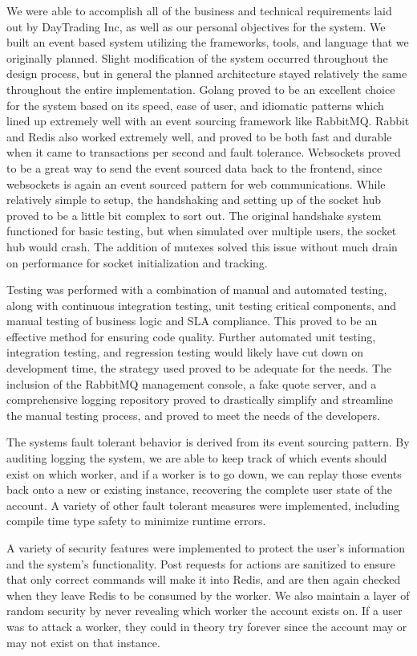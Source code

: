 \begin{Overview}
We were able to accomplish all of the business and technical requirements laid out by DayTrading Inc, as well as our personal objectives for the system.
We built an event based system utilizing the frameworks, tools, and language that we originally planned.
Slight modification of the system occurred throughout the design process, but in general the planned architecture stayed relatively the same throughout the entire implementation.
Golang proved to be an excellent choice for the system based on its speed, ease of user, and idiomatic patterns which lined up extremely well with an event sourcing framework like RabbitMQ.
Rabbit and Redis also worked extremely well, and proved to be both fast and durable when it came to transactions per second and fault tolerance.
Websockets proved to be a great way to send the event sourced data back to the frontend, since websockets is again an event sourced pattern for web communications.
While relatively simple to setup, the handshaking and setting up of the socket hub proved to be a little bit complex to sort out.
The original handshake system functioned for basic testing, but when simulated over multiple users, the socket hub would crash.
The addition of mutexes solved this issue without much drain on performance for socket initialization and tracking.

Testing was performed with a combination of manual and automated testing, along with continuous integration testing, unit testing critical components, and manual testing of business logic and SLA compliance.
This proved to be an effective method for ensuring code quality.
Further automated unit testing, integration testing, and  regression testing would likely have cut down on development time, the strategy used proved to be adequate for the needs.
The inclusion of the RabbitMQ management console, a fake quote server, and a comprehensive logging repository proved to drastically simplify and streamline the manual testing process, and proved to meet the needs of the developers.

The systems fault tolerant behavior is derived from its event sourcing pattern.
By auditing logging the system, we are able to keep track of which events should exist on which worker, and if a worker is to go down, we can replay those events back onto a new or existing instance, recovering the complete user state of the account.
A variety of other fault tolerant measures were implemented, including compile time type safety to minimize runtime errors.

A variety of security features were implemented to protect the user's information and the system’s functionality.
Post requests for actions are sanitized to ensure that only correct commands will make it into Redis, and are then again checked when they leave Redis to be consumed by the worker.
We also maintain a layer of random security by never revealing which worker the account exists on.
If a user was to attack a worker, they could in theory try forever since the account may or may not exist on that instance.


\end{Overview}
